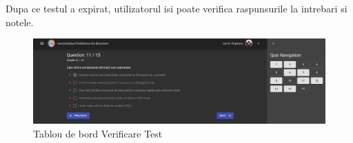 \documentclass[12pt, a4paper, oneside, romanian]{teza-upb}
\begin{document}
Dupa ce testul a expirat, utilizatorul isi poate verifica raspunsurile la intrebari si notele.

\begin{figure}[H]
\centering
\includegraphics*[width=\columnwidth]{tablou-de-bord-verificare-test}
\caption{Tablou de bord Verificare Test}
\label{tablou-de-bord-verificare-test}
\end{figure}









\end{document}
